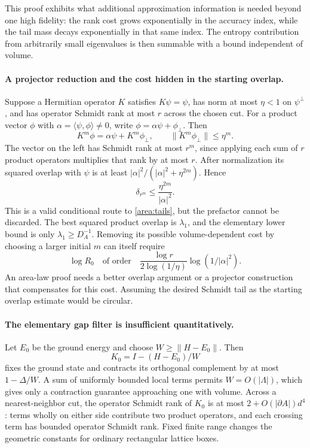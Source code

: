 \documentclass[11pt]{article}
\begin{document}
This proof exhibits what additional approximation information is
needed beyond one high fidelity: the rank cost grows exponentially
in the accuracy index, while the tail mass decays exponentially in
that same index. The entropy contribution from arbitrarily small
eigenvalues is then summable with a bound independent of volume.

\paragraph{A projector reduction and the cost hidden in the starting overlap.}
Suppose a Hermitian operator $K$ satisfies
$K\psi=\psi$, has norm at most $\eta<1$ on $\psi^\perp$, and has
operator Schmidt rank at most $r$ across the chosen cut. For a product
vector $\phi$ with $\alpha=\langle\psi,\phi\rangle\ne0$, write
$\phi=\alpha\psi+\phi_\perp$. Then
\[
 K^m\phi=\alpha\psi+K^m\phi_\perp,
 \qquad\|K^m\phi_\perp\|\le\eta^m.
\]
The vector on the left has Schmidt rank at most $r^m$, since applying
each sum of $r$ product operators multiplies that rank by at most $r$.
After normalization its squared overlap with $\psi$ is at least
$|\alpha|^2/(|\alpha|^2+\eta^{2m})$. Hence
\begin{equation}\label{area:agsp}
 \delta_{r^m}\le\frac{\eta^{2m}}{|\alpha|^2}.
\end{equation}
This is a valid conditional route to \eqref{area:tails}, but the
prefactor cannot be discarded. The best squared product overlap is
$\lambda_1$, and the elementary lower bound is only
$\lambda_1\ge D_A^{-1}$. Removing its possible volume-dependent
cost by choosing a larger initial $m$ can itself require
\[
 \log R_0\quad\text{of order}\quad
 \frac{\log r}{2\log(1/\eta)}\log(1/|\alpha|^2).
\]
An area-law proof needs a better overlap argument or a projector
construction that compensates for this cost. Assuming the desired
Schmidt tail as the starting overlap estimate would be circular.

\paragraph{The elementary gap filter is insufficient quantitatively.}
Let $E_0$ be the ground energy and choose $W\ge\|H-E_0\|$.
Then
\[
 K_0=I-(H-E_0)/W
\]
fixes the ground state and contracts its orthogonal complement by at
most $1-\Delta/W$. A sum of uniformly bounded local terms permits
$W=O(|\Lambda|)$, which gives only a contraction guarantee approaching
one with volume. Across a nearest-neighbor cut, the operator Schmidt
rank of $K_0$ is at most $2+O(|\partial A|)d^4$: terms wholly on
either side contribute two product operators, and each crossing term
has bounded operator Schmidt rank. Fixed finite range changes the
geometric constants for ordinary rectangular lattice boxes.
\end{document}
